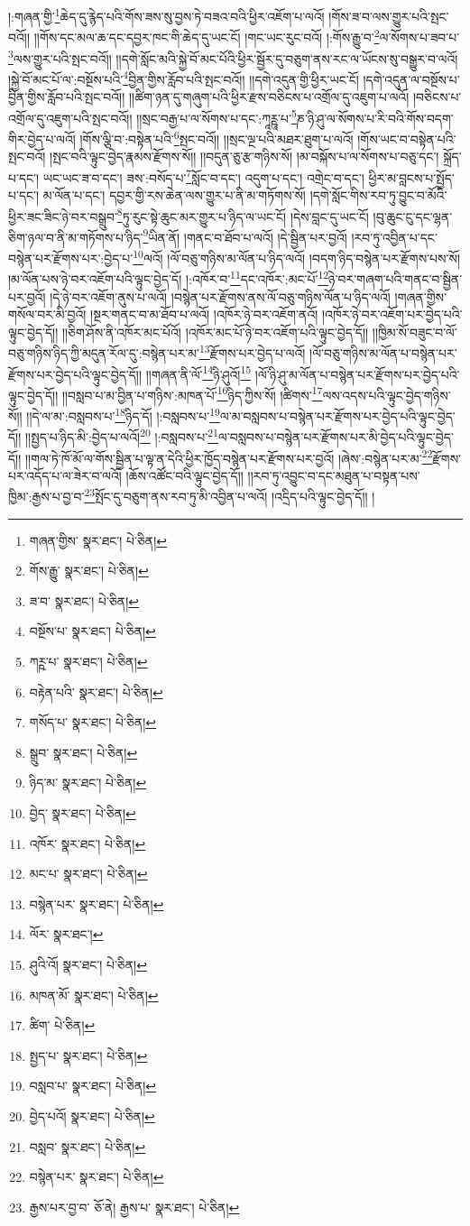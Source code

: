 །:གཞན་གྱི་\footnote{གཞན་གྱིས་  སྣར་ཐང་།  པེ་ཅིན། }ཆེད་དུ་རྙེད་པའི་གོས་ཟས་སུ་བྱས་ཏེ་བཟའ་བའི་ཕྱིར་འཇོག་པ་ལའོ། །གོས་ཟ་བ་ལས་གྱུར་པའི་སྤང་བའོ།། །།གོས་དང་མལ་ཆ་དང་དབྱར་ཁང་གི་ཆེད་དུ་ཡང་ངོ། །གང་ཡང་རུང་བའོ། །:གོས་རྒྱུ་བ་\footnote{གོས་རྒྱུ་  སྣར་ཐང་།  པེ་ཅིན། }ལ་སོགས་པ་ཟབ་པ་\footnote{ཟ་བ་  སྣར་ཐང་།  པེ་ཅིན། }ལས་གྱུར་པའི་སྤང་བའོ།། །།དགེ་སློང་མའི་སྐྱེ་བོ་མང་པོའི་ཕྱིར་སྦྱོར་དུ་བཅུག་ནས་རང་ལ་ཡོངས་སུ་བསྒྱུར་བ་ལའོ། །སྐྱེ་བོ་མང་པོ་ལ་:བསྔོས་པའི་\footnote{བསྔོས་པ་  སྣར་ཐང་།  པེ་ཅིན། }བྱིན་གྱིས་རློབ་པའི་སྤང་བའོ།། །།དགེ་འདུན་གྱི་ཕྱིར་ཡང་ངོ། །དགེ་འདུན་ལ་བསྔོས་པ་བྱིན་གྱིས་རློབ་པའི་སྤང་བའོ།། །།ཚིག་ཉན་དུ་གཞུག་པའི་ཕྱིར་རྫས་བཅིངས་པ་འགྲོལ་དུ་འཇུག་པ་ལའོ། །བཅིངས་པ་འགྲོལ་དུ་འཇུག་པའི་སྤང་བའོ།། །།སྲང་བརྒྱ་པ་ལ་སོགས་པ་དང་:ཀཱཪྵཱ་པ་\footnote{ཀཪྵ་པ་  སྣར་ཐང་།  པེ་ཅིན། }ཎ་ཉི་ཤུ་ལ་སོགས་པ་རི་བའི་གོས་བདག་གིར་བྱེད་པ་ལའོ། །གོས་ལྕི་བ་:བསྟེན་པའི་\footnote{བརྟེན་པའི་  སྣར་ཐང་།  པེ་ཅིན། }སྤང་བའོ།། །།སྲང་ལྔ་པའི་མཐར་ཐུག་པ་ལའོ། །གོས་ཡང་བ་བསྟེན་པའི་སྤང་བའོ། །སྤང་བའི་ལྟུང་བྱེད་རྣམས་རྫོགས་སོ།། །།བདུན་ཅུ་རྩ་གཉིས་སོ། །མ་བསྐོས་པ་ལ་སོགས་པ་བཅུ་དང་། སྐྲོད་པ་དང་། ཡང་ཡང་ཟ་བ་དང་། ཟས་:བསོད་པ་\footnote{གསོད་པ་  སྣར་ཐང་།  པེ་ཅིན། }སློང་བ་དང་། འདུག་པ་དང་། འགྲེང་བ་དང་། ཕྱིར་མ་བླངས་པ་སྤྱོད་པ་དང་། མ་ལོན་པ་དང་། དབྱར་གྱི་རས་ཆེན་ལས་གྱུར་པ་ནི་མ་གཏོགས་སོ། །དགེ་སློང་གིས་རབ་ཏུ་བྱུང་བ་མོའི་ཕྱིར་ཟང་ཟིང་ཉེ་བར་བསྒྲུབ་\footnote{སྒྲུབ་  སྣར་ཐང་།  པེ་ཅིན། }ཏུ་རུང་སྟེ་ཆུང་མར་གྱུར་པ་ཉིད་ལ་ཡང་ངོ། །དེས་བླང་དུ་ཡང་ངོ། །བུ་ཆུང་ངུ་དང་ལྷན་ཅིག་ཉལ་བ་ནི་མ་གཏོགས་པ་ཉིད་\footnote{ཉིད་མ་  སྣར་ཐང་།  པེ་ཅིན། }ཡིན་ནོ། །གནང་བ་ཐོབ་པ་ལའོ། །དེ་སྦྱིན་པར་བྱའོ། །རབ་ཏུ་འབྱིན་པ་དང་བསྙེན་པར་རྫོགས་པར་:བྱེད་པ་\footnote{བྱེད་  སྣར་ཐང་།  པེ་ཅིན། }ལའོ། །ལོ་བཅུ་གཉིས་མ་ལོན་པ་ཉིད་ལའོ། །བདག་ཉིད་བསྙེན་པར་རྫོགས་པས་སོ། །མ་ལོན་པས་ཉེ་བར་འཇོག་པའི་ལྟུང་བྱེད་དོ། །:འཁོར་བ་\footnote{འཁོར་  སྣར་ཐང་།  པེ་ཅིན། }དང་འཁོར་:མང་པོ་\footnote{མང་པ་  སྣར་ཐང་།  པེ་ཅིན། }ཉེ་བར་གཞག་པའི་གནང་བ་སྦྱིན་པར་བྱའོ། །དེ་ཉེ་བར་འཇོག་ནུས་པ་ལའོ། །བསྙེན་པར་རྫོགས་ནས་ལོ་བཅུ་གཉིས་ལོན་པ་ཉིད་ལའོ། །གཞན་གྱིས་གསོལ་བར་མི་བྱའོ། །སྔར་གནང་བ་མ་ཐོབ་པ་ལའོ། །འཁོར་ཉེ་བར་འཇོག་ནའོ། །འཁོར་ཉེ་བར་འཇོག་པར་བྱེད་པའི་ལྟུང་བྱེད་དོ།། །།ཅིག་ཤོས་ནི་འཁོར་མང་པོའོ། །འཁོར་མང་པོ་ཉེ་བར་འཇོག་པའི་ལྟུང་བྱེད་དོ།། །།ཁྱིམ་སོ་བཟུང་བ་ལོ་བཅུ་གཉིས་ཉིད་ཀྱི་མདུན་རོལ་དུ་:བསྙེན་པར་མ་\footnote{བསྙེན་པར་  སྣར་ཐང་།  པེ་ཅིན། }རྫོགས་པར་བྱེད་པ་ལའོ། །ལོ་བཅུ་གཉིས་མ་ལོན་པ་བསྙེན་པར་རྫོགས་པར་བྱེད་པའི་ལྟུང་བྱེད་དོ།། །།གཞན་ནི་ལོ་\footnote{ལོར་  སྣར་ཐང་། }ཉི་ཤུའོ།\footnote{ཤུའི་འོ།  སྣར་ཐང་།  པེ་ཅིན། } །ལོ་ཉི་ཤུ་མ་ལོན་པ་བསྙེན་པར་རྫོགས་པར་བྱེད་པའི་ལྟུང་བྱེད་དོ།། །།བསླབ་པ་མ་བྱིན་པ་གཉིས་:མཁན་པོ་\footnote{མཁན་མོ་  སྣར་ཐང་།  པེ་ཅིན། }ཉིད་ཀྱིས་སོ། །ཚིགས་\footnote{ཚིག་  པེ་ཅིན། }ལས་འདས་པའི་ལྟུང་བྱེད་གཉིས་སོ།། །།དེ་ལ་མ་:བསླབས་པ་\footnote{སྤྱད་པ་  སྣར་ཐང་།  པེ་ཅིན། }ཉིད་དོ། །:བསླབས་པ་\footnote{བསླབ་པ་  སྣར་ཐང་།  པེ་ཅིན། }ལ་མ་བསླབས་པ་བསྙེན་པར་རྫོགས་པར་བྱེད་པའི་ལྟུང་བྱེད་དོ།། །།སྤྱད་པ་ཉིད་མི་:བྱེད་པ་ལའོ།\footnote{བྱེད་པའོ།  སྣར་ཐང་།  པེ་ཅིན། } །:བསླབས་པ་\footnote{བསླབ་  སྣར་ཐང་།  པེ་ཅིན། }ལ་བསླབས་པ་བསྙེན་པར་རྫོགས་པར་མི་བྱེད་པའི་ལྟུང་བྱེད་དོ།། །།གལ་ཏེ་ཁོ་མོ་ལ་གོས་སྦྱིན་པ་ལྟ་ན་དེའི་ཕྱིར་ཁྱོད་བསྙེན་པར་རྫོགས་པར་བྱའོ། །ཞེས་:བསྙེན་པར་མ་\footnote{བསྙེན་པར་  སྣར་ཐང་།  པེ་ཅིན། }རྫོགས་པར་འདོད་པ་ལ་ཟེར་བ་ལའོ། །ཆོས་འཚོང་བའི་ལྟུང་བྱེད་དོ།། །།རབ་ཏུ་འབྱུང་བ་དང་མཐུན་པ་བསྟན་པས་ཁྱིམ་:རྒྱས་པ་བྱ་བ་\footnote{རྒྱས་པར་བྱ་བ་  ཅོ་ནེ། རྒྱས་པ་  སྣར་ཐང་།  པེ་ཅིན། }སྤོང་དུ་བཅུག་ནས་རབ་ཏུ་མི་འབྱིན་པ་ལའོ། །འདྲིད་པའི་ལྟུང་བྱེད་དོ།། །
